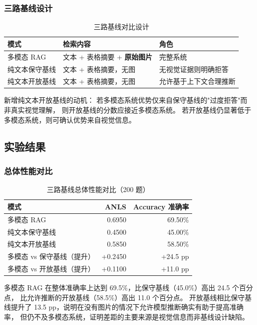 ﻿\documentclass[UTF8, heading=true]{ctexart}
\begin{document}
\subsubsection{三路基线设计}

\begin{table}[H]
\centering
\caption{三路基线对比设计}
\begin{tabular}{lll}
\toprule
\textbf{模式} & \textbf{检索内容} & \textbf{角色} \\
\midrule
多模态 RAG & 文本 + 表格摘要 + \textbf{原始图片} & 完整系统 \\
纯文本保守基线 & 文本 + 表格摘要，无图 & 无视觉证据则明确拒答 \\
纯文本开放基线 & 文本 + 表格摘要，无图 & 允许基于上下文合理推断 \\
\bottomrule
\end{tabular}
\label{tab:baselines}
\end{table}

新增纯文本开放基线的动机：
若多模态系统优势仅来自保守基线的"过度拒答"而非真实视觉理解，
则开放基线的分数应接近多模态系统。
若开放基线仍显著低于多模态系统，则可确认优势来自视觉信息。

\subsection{实验结果}

\subsubsection{总体性能对比}

\begin{table}[H]
\centering
\caption{三路基线总体性能对比（200 题）}
\begin{tabular}{lrr}
\toprule
\textbf{模式} & \textbf{ANLS} & \textbf{Accuracy 准确率} \\
\midrule
多模态 RAG & 0.6950 & 69.50\% \\
纯文本保守基线 & 0.4500 & 45.00\% \\
纯文本开放基线 & 0.5850 & 58.50\% \\
\midrule
多模态 vs 保守基线（提升）& +0.2450 & +24.5 pp \\
多模态 vs 开放基线（提升）& +0.1100 & +11.0 pp \\
\bottomrule
\end{tabular}
\label{tab:overall}
\end{table}

多模态 RAG 在整体准确率上达到 69.5\%，比保守基线（45.0\%）高出 24.5 个百分点，
比允许推断的开放基线（58.5\%）高出 11.0 个百分点。
开放基线相比保守基线提升了 13.5 pp，说明在没有图片的情况下允许模型推断确实有助于提高准确率，
但仍不及多模态系统，证明差距的主要来源是视觉信息而非基线设计缺陷。
\end{document}
